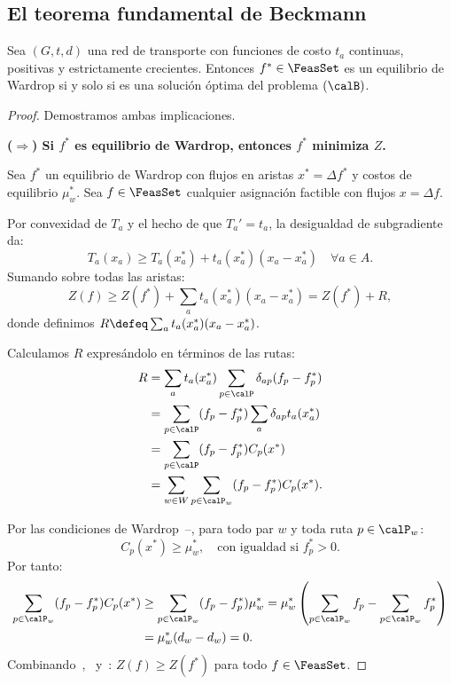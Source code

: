 \subsection{El teorema fundamental de Beckmann}

\begin{theorem}\label{thm:beckmann}
Sea $(G, t, d)$ una red de transporte con funciones de costo $t_a$ continuas, positivas y estrictamente crecientes. Entonces $f^* \in \FeasSet$ es un equilibrio de Wardrop si y solo si es una solución óptima del problema $(\calB)$.
\end{theorem}

\begin{proof}
Demostramos ambas implicaciones.

\medskip
\noindent\textbf{($\Rightarrow$) Si $f^*$ es equilibrio de Wardrop, entonces $f^*$ minimiza $Z$.}

Sea $f^*$ un equilibrio de Wardrop con flujos en aristas $x^* = \Delta f^*$ y costos de equilibrio $\mu_w^*$. Sea $f \in \FeasSet$ cualquier asignación factible con flujos $x = \Delta f$.

Por convexidad de $T_a$ y el hecho de que $T_a' = t_a$, la desigualdad de subgradiente da:
\begin{equation}\label{eq:subgradient}
T_a(x_a) \geq T_a(x_a^*) + t_a(x_a^*)(x_a - x_a^*) \quad \forall a \in A.
\end{equation}
Sumando sobre todas las aristas:
\begin{equation}\label{eq:sum_subgradient}
Z(f) \geq Z(f^*) + \sum_a t_a(x_a^*)(x_a - x_a^*) = Z(f^*) + R,
\end{equation}
donde definimos $R \defeq \sum_a t_a(x_a^*)(x_a - x_a^*)$.

Calculamos $R$ expresándolo en términos de las rutas:
\begin{align}
R &= \sum_{a} t_a(x_a^*) \sum_{p \in \calP} \delta_{ap}(f_p - f_p^*) \nonumber\\
  &= \sum_{p \in \calP} (f_p - f_p^*) \sum_{a} \delta_{ap} t_a(x_a^*) \nonumber\\
  &= \sum_{p \in \calP} (f_p - f_p^*) C_p(x^*) \nonumber\\
  &= \sum_{w \in W} \sum_{p \in \calP_w} (f_p - f_p^*) C_p(x^*). \label{eq:R}
\end{align}

Por las condiciones de Wardrop~--, para todo par $w$ y toda ruta $p \in \calP_w$:
\[
C_p(x^*) \geq \mu_w^*, \quad \text{con igualdad si } f_p^* > 0.
\]
Por tanto:
\begin{align}
\sum_{p \in \calP_w} (f_p - f_p^*) C_p(x^*) &\geq \sum_{p \in \calP_w} (f_p - f_p^*) \mu_w^* = \mu_w^* \left(\sum_{p \in \calP_w} f_p - \sum_{p \in \calP_w} f_p^*\right) \nonumber\\
&= \mu_w^*(d_w - d_w) = 0. \label{eq:R_nonneg}
\end{align}
Combinando~,~ y~: $Z(f) \geq Z(f^*)$ para todo $f \in \FeasSet$.


\end{proof}
